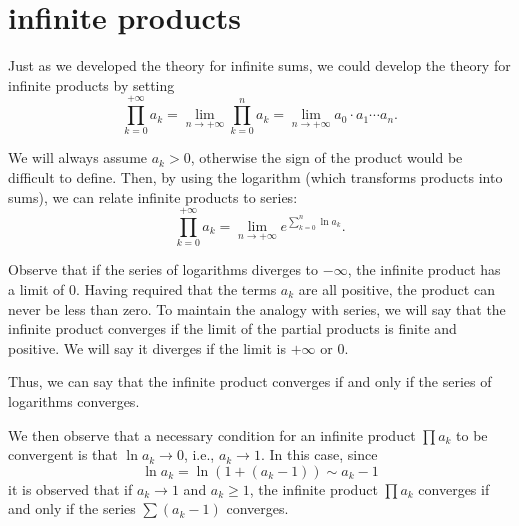 \section{infinite products}

Just as we developed the theory for infinite sums, we could develop the theory
for infinite products by setting
\[
  \prod_{k=0}^{+\infty} a_k = \lim_{n\to +\infty} \prod_{k=0}^n a_k
  = \lim_{n\to +\infty} a_0 \cdot a_1 \cdots a_n.
\]

We will always assume $a_k>0$, otherwise the sign of the product would be
difficult to define. Then, by using the logarithm (which transforms products
into sums), we can relate infinite products to series:
\[
  \prod_{k=0}^{+\infty} a_k = \lim_{n\to +\infty} e^{\sum_{k=0}^n \ln a_k}.
\]

Observe that if the series of logarithms diverges to $-\infty$, the infinite
product has a limit of $0$. Having required that the terms $a_k$ are all
positive, the product can never be less than zero. To maintain the analogy with
series, we will say that the infinite product converges if the limit of the
partial products is finite and positive. We will say it diverges if the limit is
$+\infty$ or $0$.

Thus, we can say that the infinite product converges if and only if the series
of logarithms converges.

We then observe that a necessary condition for an infinite product $\prod a_k$
to be convergent is that $\ln a_k\to 0$, i.e., $a_k \to 1$. In this case, since
\[
  \ln a_k = \ln (1+(a_k-1)) \sim a_k - 1
\]
it is observed that if $a_k\to 1$ and $a_k\ge 1$, the infinite product $\prod
a_k$ converges if and only if the series $\sum (a_k-1)$ converges.

